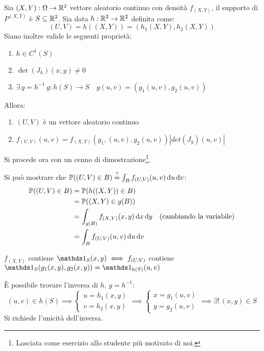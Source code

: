 \begin{propb}[\JPTh{12.6,12,7}]
  Sia $(X,Y): \Omega \to \mathbb R^2 $ vettore aleatorio continuo con densità $f_{(X,Y)}$, il supporto di $P^{(X,Y)}$ è $S \subseteq \mathbb R^2$. Sia data $h: \mathbb R^2 \to \mathbb R^2$ definita come:\\
  $$(U,V) = h((X,Y))= (h_1(X,Y), h_2(X,Y))$$
  Siano inoltre valide le seguenti proprietà:
  \begin{enumerate}
    \item $h \in C^1(S)$
    \item $ \det(J_h)(x,y) \ne 0$
    \item $\exists \, g = h^{-1} \ g: h(S) \to S \quad g(u,v)= (g_1(u,v), g_2(u,v)) $
  \end{enumerate}
  Allora:
  \begin{enumerate}
    \item $(U,V)$ è un vettore aleatorio continuo
    \item $f_{(U,V)}(u,v)= f_{(X,Y)}(g_1,(u,v), g_2(u,v)) | det(J_g)(u,v)|$
  \end{enumerate}
\end{propb}

Si procede ora con un cenno di dimostrazione\footnote{Lasciata come esercizio allo studente più motivato di noi.}.
\begin{dimo}\belowdisplayskip=-17pt
  Si può mostrare che $\mathbb P((U,V) \in B) \stackrel{?}{=} \int_B f_{(U,V)}(u,v) \, \mathrm d u \, \mathrm d v$:
  \begin{align*}
    \mathbb P((U,V) \in B) &= \mathbb P( h((X,Y)) \in B) \\
    & = \mathbb P( (X,Y) \in g(B)) \\
    & = \int_{g(B)} f_{(X,Y)}(x,y) \, \mathrm d x \, \mathrm d y & (\text{cambiando la variabile}) \\
    & = \int_B f_{(U,V)} (u,v) \, \mathrm d u \, \mathrm d v
  \end{align*}\qedhere
\end{dimo}

\medskip
\begin{oss}
  $f_{(X,Y)}$ contiene $\Ind_S(x,y) \iff f_{(U,V)}$ contiene $ \Ind_S(g_1(x,y), g_2(x,y)) = \Ind_{h(S)}(u,v)$\\
\end{oss}

\begin{oss}
  È possibile trovare l'inversa di $h$, $g= h^{-1}$:
  $$(u,v) \in h(S) \implies
  \begin{cases}
    u= h_1(x,y) \\
    v= h_2(x,y)
  \end{cases} \implies
  \begin{cases}
    x= g_1(u,v)\\
    y= g_2(u,v)
  \end{cases}
  \implies \exists! \, (x,y) \in S$$
  Si richiede l'unicità dell'inversa.
\end{oss}

